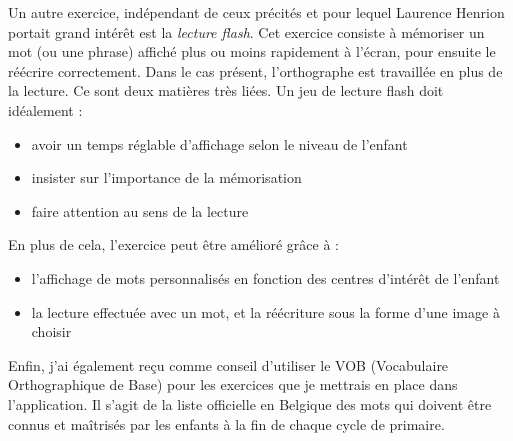Un autre exercice, indépendant de ceux précités et pour lequel Laurence Henrion portait grand intérêt est la \textit{lecture flash}. Cet exercice consiste à mémoriser un mot (ou une phrase) affiché plus ou moins rapidement à l'écran, pour ensuite le réécrire correctement. Dans le cas présent, l'orthographe est travaillée en plus de la lecture. Ce sont deux matières très liées. Un jeu de lecture flash doit idéalement :
\begin{itemize}
\item avoir un temps réglable d'affichage selon le niveau de l'enfant
\item insister sur l'importance de la mémorisation
\item faire attention au sens de la lecture
\end{itemize}
En plus de cela, l'exercice peut être amélioré grâce à :
\begin{itemize}
\item l'affichage de mots personnalisés en fonction des centres d'intérêt de l'enfant
\item la lecture effectuée avec un mot, et la réécriture sous la forme d'une image à choisir\\
\end{itemize}

Enfin, j'ai également reçu comme conseil d'utiliser le VOB (Vocabulaire Orthographique de Base) pour les exercices que je mettrais en place dans l'application. Il s'agit de la liste officielle en Belgique des mots qui doivent être connus et maîtrisés par les enfants à la fin de chaque cycle de primaire.


\newpage
